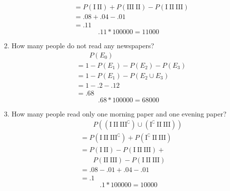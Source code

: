 \begin{enumerate}
\begin{align*}
        &= P(\text{I}\ \text{II})+P(\text{III}\ \text{II})- P(\text{I}\ \text{II}\ \text{III})\\
        &= .08 + .04 - .01\\
        &= .11
    \end{align*}
    \[ .11 * 100000 = 11000 \]
    \item How many people do not read any newspapers?
    \begin{align*}
        &\phantom{\;=\;} P(E_0)\\
        &= 1 - P(E_1) - P(E_2) - P(E_3)\\
        &= 1 - P(E_1) - P(E_2\cup E_3)\\
        &= 1 - .2 - .12\\
        &= .68
    \end{align*}
    \[ .68 * 100000 = 68000 \]
    \item How many people read only one morning paper and one evening paper?
    \begin{align*}
        &\phantom{\;=\;} P((\text{I}\ \text{II}\ \text{III}^\complement )\cup(\text{I}^\complement \ \text{II}\ \text{III}))\\
        &=
        P(\text{I}\ \text{II}\ \text{III}^\complement ) + P(\text{I}^\complement \ \text{II}\ \text{III})\\
        &= P(\text{I}\ \text{II}) - P(\text{I}\ \text{II}\ \text{III}) + {}\\
        &\phantom{\;=\;} P(\text{II}\ \text{III}) - P(\text{I}\ \text{II}\ \text{III})\\
        &= .08 - .01 + .04 - .01\\
        &= .1
    \end{align*}
    \[ .1 * 100000 = 10000 \]
\end{enumerate}